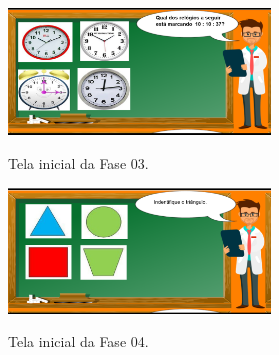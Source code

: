 \documentclass[
	12pt,				%
    oneside,			%
	a4paper,			%
	english,			%
	french,				%
	spanish,			%
	brazil,				%
	]{abntex2}
\begin{document}
\begin{figure} [ht] 


\caption{Tela inicial da Fase 03.}

\includegraphics[width=0.62\textwidth]{jogo03.png} %
\centering
\\
\label{jogo03} 
\end{figure}


\begin{figure} [ht] 


\caption{Tela inicial da Fase 04.}

\includegraphics[width=0.62\textwidth]{jogo04.png} %
\centering
\\
\label{jogo04} 
\end{figure}
\end{document}
